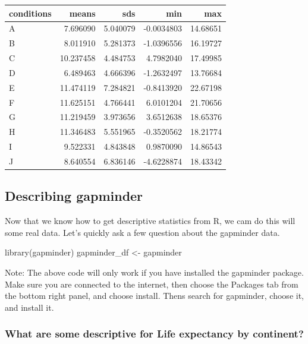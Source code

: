 \documentclass[
]{book}
\newenvironment{Shaded}{\begin{snugshade}}{\end{snugshade}}
\newcommand{\FunctionTok}[1]{\textcolor[rgb]{0.00,0.00,0.00}{#1}}
\newcommand{\NormalTok}[1]{#1}
\newcommand{\OtherTok}[1]{\textcolor[rgb]{0.56,0.35,0.01}{#1}}
\begin{document}
\begin{tabular}{l|r|r|r|r}
\hline
conditions & means & sds & min & max\\
\hline
A & 7.696090 & 5.040079 & -0.0034803 & 14.68651\\
\hline
B & 8.011910 & 5.281373 & -1.0396556 & 16.19727\\
\hline
C & 10.237458 & 4.484753 & 4.7982040 & 17.49985\\
\hline
D & 6.489463 & 4.666396 & -1.2632497 & 13.76684\\
\hline
E & 11.474119 & 7.284821 & -0.8413920 & 22.67198\\
\hline
F & 11.625151 & 4.766441 & 6.0101204 & 21.70656\\
\hline
G & 11.219459 & 3.973656 & 3.6512638 & 18.65376\\
\hline
H & 11.346483 & 5.551965 & -0.3520562 & 18.21774\\
\hline
I & 9.522331 & 4.843848 & 0.9870090 & 14.86543\\
\hline
J & 8.640554 & 6.836146 & -4.6228874 & 18.43342\\
\hline
\end{tabular}

\hypertarget{describing-gapminder}{%
\subsection{Describing gapminder}\label{describing-gapminder}}

Now that we know how to get descriptive statistics from R, we cam do this will some real data. Let's quickly ask a few question about the gapminder data.

\begin{Shaded}
\begin{Highlighting}[]
\FunctionTok{library}\NormalTok{(gapminder)}
\NormalTok{gapminder\_df }\OtherTok{\textless{}{-}}\NormalTok{ gapminder}
\end{Highlighting}
\end{Shaded}

Note: The above code will only work if you have installed the gapminder package. Make sure you are connected to the internet, then choose the Packages tab from the bottom right panel, and choose install. Thens search for gapminder, choose it, and install it.

\hypertarget{what-are-some-descriptive-for-life-expectancy-by-continent}{%
\subsubsection{What are some descriptive for Life expectancy by continent?}\label{what-are-some-descriptive-for-life-expectancy-by-continent}}
\end{document}

